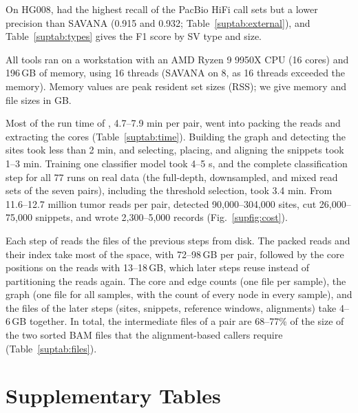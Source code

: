 
On HG008, \tool{} had the highest recall of the PacBio HiFi call sets but a lower precision than SAVANA (0.915 and 0.932; Table~\ref{suptab:external}), and Table~\ref{suptab:types} gives the F1 score by SV type and size.

\FloatBarrier
{}


All tools ran on a workstation with an AMD Ryzen 9 9950X CPU (16 cores) and 196\,GB of memory, using 16 threads (SAVANA on 8, as 16 threads exceeded the memory).
Memory values are peak resident set sizes (RSS); we give memory and file sizes in GB.

Most of the run time of \tool{}, 4.7--7.9 min per pair, went into packing the reads and extracting the cores (Table~\ref{suptab:time}).
Building the graph and detecting the sites took less than 2 min, and selecting, placing, and aligning the snippets took 1--3 min.
Training one classifier model took 4--5 s, and the complete classification step for all 77 runs on real data (the full-depth, downsampled, and mixed read sets of the seven pairs), including the threshold selection, took 3.4 min.
From 11.6--12.7 million tumor reads per pair, \tool{} detected 90,000--304,000 sites, cut 26,000--75,000 snippets, and wrote 2,300--5,000 records (Fig.~\ref{supfig:cost}).


Each step of \tool{} reads the files of the previous steps from disk.
The packed reads and their index take most of the space, with 72--98\,GB per pair, followed by the core positions on the reads with 13--18\,GB, which later steps reuse instead of partitioning the reads again.
The core and edge counts (one file per sample), the graph (one file for all samples, with the count of every node in every sample), and the files of the later steps (sites, snippets, reference windows, alignments) take 4--6\,GB together.
In total, the intermediate files of a pair are 68--77\% of the size of the two sorted BAM files that the alignment-based callers require (Table~\ref{suptab:files}).

\clearpage
\section*{Supplementary Tables}\label{supsec:tables}


